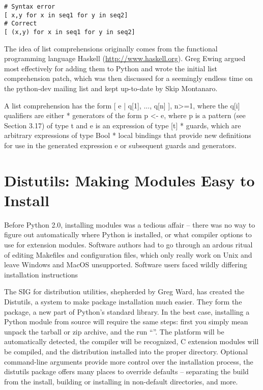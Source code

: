 \documentclass{howto}
\begin{document}
\begin{verbatim}
# Syntax error
[ x,y for x in seq1 for y in seq2]
# Correct
[ (x,y) for x in seq1 for y in seq2]
\end{verbatim}


The idea of list comprehensions originally comes from the functional
programming language Haskell (\url{http://www.haskell.org}).  Greg
Ewing argued most effectively for adding them to Python and wrote the
initial list comprehension patch, which was then discussed for a
seemingly endless time on the python-dev mailing list and kept
up-to-date by Skip Montanaro.




   A list comprehension has the form [ e | q[1], ..., q[n] ], n>=1, where
   the q[i] qualifiers are either
     * generators of the form p <- e, where p is a pattern (see Section
       3.17) of type t and e is an expression of type [t]
     * guards, which are arbitrary expressions of type Bool
     * local bindings that provide new definitions for use in the
       generated expression e or subsequent guards and generators.


\section{Distutils: Making Modules Easy to Install}

Before Python 2.0, installing modules was a tedious affair -- there
was no way to figure out automatically where Python is installed, or
what compiler options to use for extension modules.  Software authors
had to go through an ardous ritual of editing Makefiles and
configuration files, which only really work on Unix and leave Windows
and MacOS unsupported.  Software users faced wildly differing
installation instructions 

The SIG for distribution utilities, shepherded by Greg Ward, has
created the Distutils, a system to make package installation much
easier.  They form the  package, a new part of
Python's standard library. In the best case, installing a Python
module from source will require the same steps: first you simply mean
unpack the tarball or zip archive, and the run ``''.  The platform will be automatically detected, the compiler
will be recognized, C extension modules will be compiled, and the
distribution installed into the proper directory.  Optional
command-line arguments provide more control over the installation
process, the distutils package offers many places to override defaults
-- separating the build from the install, building or installing in
non-default directories, and more.
\end{document}
